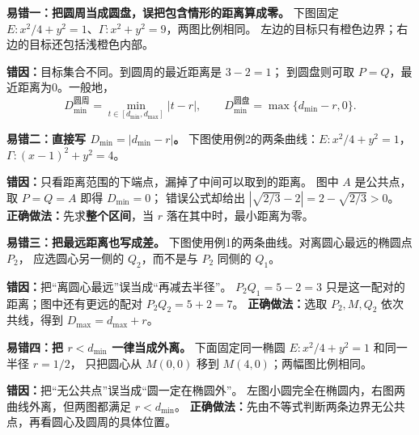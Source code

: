 \begin{trapbox}
\begin{minipage}{\linewidth}
\textbf{易错一：把圆周当成圆盘，误把包含情形的距离算成零。}
下图固定 $E:x^2/4+y^2=1$、$\Gamma:x^2+y^2=9$，两图比例相同。
左边的目标只有橙色边界；右边的目标还包括浅橙色内部。

\end{minipage}
\textbf{错因：}目标集合不同。到圆周的最近距离是 $3-2=1$；
到圆盘则可取 $P=Q$，最近距离为0。一般地，
\[
 D_{\min}^{\text{圆周}}=\min_{t\in[d_{\min},d_{\max}]}|t-r|,
 \qquad D_{\min}^{\text{圆盘}}=\max\{d_{\min}-r,0\}.
\]
\end{trapbox}

\begin{trapbox}
\begin{minipage}{\linewidth}
\textbf{易错二：直接写 $D_{\min}=|d_{\min}-r|$。}
下图使用例2的两条曲线：$E:x^2/4+y^2=1$，$\Gamma:(x-1)^2+y^2=4$。

\end{minipage}
\textbf{错因：}只看距离范围的下端点，漏掉了中间可以取到的距离。
图中 $A$ 是公共点，取 $P=Q=A$ 即得 $D_{\min}=0$；
错误公式却给出 $|\sqrt{2/3}-2|=2-\sqrt{2/3}>0$。
\textbf{正确做法：}先求\textbf{整个区间}，当 $r$ 落在其中时，最小距离为零。
\end{trapbox}

\begin{trapbox}
\begin{minipage}{\linewidth}
\textbf{易错三：把最远距离也写成差。}
下图使用例1的两条曲线。对离圆心最远的椭圆点 $P_2$，
应选圆心另一侧的 $Q_2$，而不是与 $P_2$ 同侧的 $Q_1$。

\end{minipage}
\textbf{错因：}把“离圆心最远”误当成“再减去半径”。
$P_2Q_1=5-2=3$ 只是这一配对的距离；图中还有更远的配对
$P_2Q_2=5+2=7$。
\textbf{正确做法：}选取 $P_2,M,Q_2$ 依次共线，得到 $D_{\max}=d_{\max}+r$。
\end{trapbox}

\begin{trapbox}
\begin{minipage}{\linewidth}
\textbf{易错四：把 $r<d_{\min}$ 一律当成外离。}
下面固定同一椭圆 $E:x^2/4+y^2=1$ 和同一半径 $r=1/2$，
只把圆心从 $M(0,0)$ 移到 $M(4,0)$；两幅图比例相同。

\end{minipage}
\textbf{错因：}把“无公共点”误当成“圆一定在椭圆外”。
左图小圆完全在椭圆内，右图两曲线外离，但两图都满足 $r<d_{\min}$。
\textbf{正确做法：}先由不等式判断两条边界无公共点，再看圆心及圆周的具体位置。
\end{trapbox}


